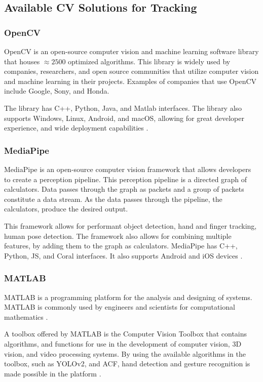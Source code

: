 \documentclass{report}
\begin{document}
\subsection{Available CV Solutions for Tracking}

\subsubsection{OpenCV}

OpenCV is an open-source computer vision and machine learning software library
that houses ${\approx2500}$ optimized algorithms. This library is widely used by
companies, researchers, and open source communities that utilize computer vision
and machine learning in their projects. Examples of companies that use OpenCV
include Google, Sony, and Honda.

The library has C++, Python, Java, and Matlab interfaces. The library also supports
Windows, Linux, Android, and macOS, allowing for great developer experience, and
wide deployment capabilities \parencite{opencv}.

\subsubsection{MediaPipe}
\label{section:rrl-mediapipe}

MediaPipe is an open-source computer vision framework that allows developers to
create a perception pipeline. This perception pipeline is a directed graph of
calculators. Data passes through the graph as packets and a group of packets
constitute a data stream. As the data passes through the pipeline, the
calculators, produce the desired output.

This framework allows for performant object detection, hand and finger tracking,
human pose detection. The framework also allows for combining multiple features,
by adding them to the graph as calculators. MediaPipe has C++, Python, JS, and
Coral interfaces. It also supports Android and iOS devices
\parencite{mediapipe}.

\subsubsection{MATLAB}
MATLAB is a programming platform for the analysis and designing of systems.
MATLAB is commonly used by engineers and scientists for computational
mathematics \parencite{what-matlab}.

A toolbox offered by MATLAB is the Computer Vision Toolbox that contains
algorithms, and functions for use in the development of computer vision, 3D
vision, and video processing systems. By using the available algorithms in the
toolbox, such as YOLOv2, and ACF, hand detection and gesture recognition is made
possible in the platform \parencite{matlab}.
\end{document}
